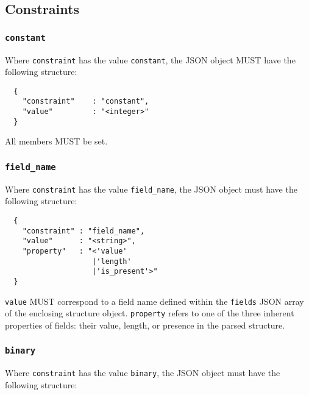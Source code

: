\documentclass[twocolumn,a4paper]{article}
\begin{document}
\subsection{Constraints}
\label{sec:constraints}

\subsubsection{\texttt{constant}}

Where \texttt{constraint} has the value \texttt{constant}, the JSON object MUST have the
following structure:

\begin{verbatim}
  {
    "constraint"    : "constant",
    "value"         : "<integer>"
  }
\end{verbatim}

All members MUST be set.

\subsubsection{\texttt{field\_name}}

Where \texttt{constraint} has the value \texttt{field\_name}, the JSON object must have
the following structure:

\begin{verbatim}
  {
    "constraint" : "field_name",
    "value"      : "<string>",
    "property"   : "<'value'
                    |'length'
                    |'is_present'>"
  }
\end{verbatim}

\texttt{value} MUST correspond to a field name defined within the \texttt{fields} JSON
array of the enclosing structure object. \texttt{property} refers to one of the three
inherent properties of fields: their value, length, or presence in the parsed structure.

\subsubsection{\texttt{binary}}

Where \texttt{constraint} has the value \texttt{binary}, the JSON object must have
the following structure:
\end{document}
